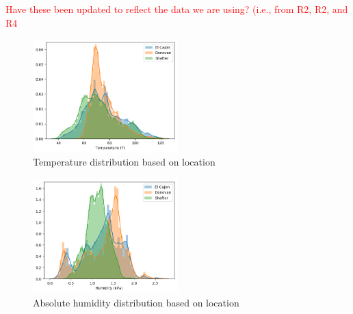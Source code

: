 \documentclass[journal abbreviation, manuscript]{copernicus}
\newcommand\todo[1]{\textcolor{red}{#1}}
\begin{document}
\todo{Have these been updated to reflect the data we are using? (i.e., from R2, R2, and R4}



\iffalse

\begin{figure}[H]
\centering
\includegraphics[width=0.5\textwidth]{results/distributions/temperature.png}
\caption{Temperature distribution based on
location}
\label{fig:temperature}
\end{figure}

\begin{figure}[H]
\centering
\includegraphics[width=0.5\textwidth]{results/distributions/humidity.png}
\caption{Absolute humidity distribution based on
location}
\label{fig:humidity}
\end{figure}
\end{document}
